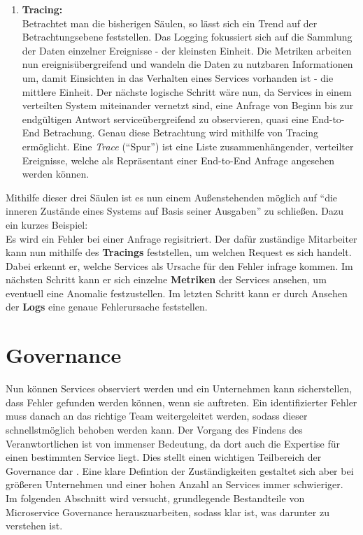 \begin{definition}
	\begin{enumerate}
		\setcounter{enumi}{\value{pillarsCounter}}
		\item \textbf{Tracing:}\\
		Betrachtet man die bisherigen Säulen, so lässt sich ein Trend auf der Betrachtungsebene feststellen. Das Logging fokussiert sich auf die Sammlung der Daten einzelner Ereignisse - der kleinsten Einheit. Die Metriken arbeiten nun ereignisübergreifend und wandeln die Daten zu nutzbaren Informationen um, damit Einsichten in das Verhalten eines Services vorhanden ist - die mittlere Einheit. Der nächste logische Schritt wäre nun, da Services in einem verteilten System miteinander vernetzt sind, eine Anfrage von Beginn bis zur endgültigen Antwort serviceübergreifend zu observieren, quasi eine End-to-End Betrachung. Genau diese Betrachtung wird mithilfe von Tracing ermöglicht. Eine \textit{Trace} (\enquote{Spur}) ist eine Liste zusammenhängender, verteilter Ereignisse, welche als Repräsentant einer End-to-End Anfrage angesehen werden können.
	\end{enumerate}

\end{definition}
Mithilfe dieser drei Säulen ist es nun einem Außenstehenden möglich auf \enquote{die inneren Zustände eines Systems auf Basis seiner Ausgaben} zu schließen. Dazu ein kurzes Beispiel:\\
Es wird ein Fehler bei einer Anfrage regisitriert. Der dafür zuständige Mitarbeiter kann nun mithilfe des \textbf{Tracings} feststellen, um welchen Request es sich handelt. Dabei erkennt er, welche Services als Ursache für den Fehler infrage kommen. Im nächsten Schritt kann er sich einzelne \textbf{Metriken} der Services ansehen, um eventuell eine Anomalie festzustellen. Im letzten Schritt kann er durch Ansehen der \textbf{Logs} eine genaue Fehlerursache feststellen.


\section{Governance}

Nun können Services observiert werden und ein Unternehmen kann sicherstellen, dass Fehler gefunden werden können, wenn sie auftreten. Ein identifizierter Fehler muss danach an das richtige Team weitergeleitet werden, sodass dieser schnellstmöglich behoben werden kann. Der Vorgang des Findens des Veranwtortlichen ist von immenser Bedeutung, da dort auch die Expertise für einen bestimmten Service liegt. Dies stellt einen wichtigen Teilbereich der Governance dar \autocite[S. 6]{bavskarada2018architecting}. Eine klare Defintion der Zuständigkeiten gestaltet sich aber bei größeren Unternehmen und einer hohen Anzahl an Services immer schwieriger. Im folgenden Abschnitt wird versucht, grundlegende Bestandteile von Microservice Governance herauszuarbeiten, sodass klar ist, was darunter zu verstehen ist.

